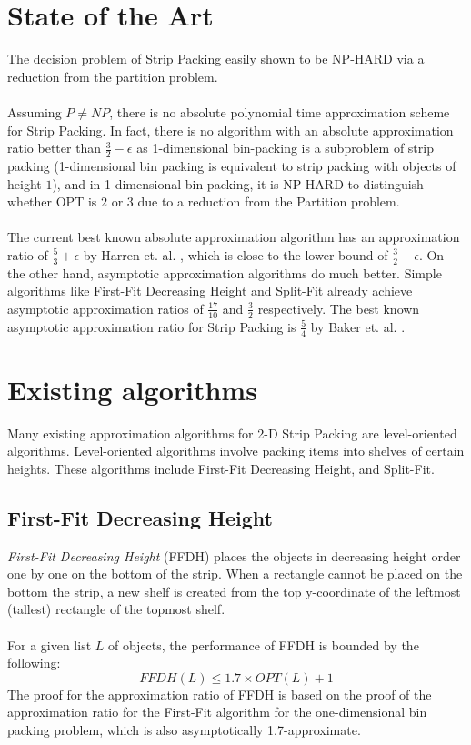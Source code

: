 \documentclass{article}
\begin{document}
\section{State of the Art}
The decision problem of Strip Packing easily shown to be NP-HARD via a reduction from the partition problem.\\
\\
Assuming $P \neq NP$, there is no absolute polynomial time approximation scheme for Strip Packing. In fact, there is no algorithm with an absolute approximation ratio better than $\frac{3}{2} - \epsilon$ as 1-dimensional bin-packing is a subproblem of strip packing (1-dimensional bin packing is equivalent to strip packing with objects of height $1$), and in 1-dimensional bin packing, it is NP-HARD to distinguish whether OPT is $2$ or $3$ due to a reduction from the Partition problem.\\
\\
The current best known absolute approximation algorithm has an approximation ratio of $\frac{5}{3} + \epsilon$ by Harren et. al. \cite{harren1}, which is close to the lower bound of $\frac{3}{2} - \epsilon$. On the other hand, asymptotic approximation algorithms do much better. Simple algorithms like First-Fit Decreasing Height and Split-Fit already achieve asymptotic approximation ratios of $\frac{17}{10}$ and $\frac{3}{2}$ respectively. The best known asymptotic approximation ratio for Strip Packing is $\frac{5}{4}$ by Baker et. al.  \cite{baker1}.\\

\section{Existing algorithms}
Many existing approximation algorithms for 2-D Strip Packing are level-oriented algorithms. Level-oriented algorithms involve packing items into shelves of certain heights. These algorithms include First-Fit Decreasing Height, and Split-Fit.
\subsection{First-Fit Decreasing Height}
\textit{First-Fit Decreasing Height} (FFDH) places the objects in decreasing height order one by one on the bottom of the strip. When a rectangle cannot be placed on the bottom the strip, a new shelf is created from the top y-coordinate of the leftmost (tallest) rectangle of the topmost shelf.\\
\\
For a given list $L$ of objects, the performance of FFDH is bounded by the following:
\[
	FFDH(L) \leq 1.7 \times OPT(L) + 1
\]
The proof for the approximation ratio of FFDH is based on the proof of the approximation ratio for the First-Fit algorithm for the one-dimensional bin packing problem, which is also asymptotically 1.7-approximate.
\end{document}
